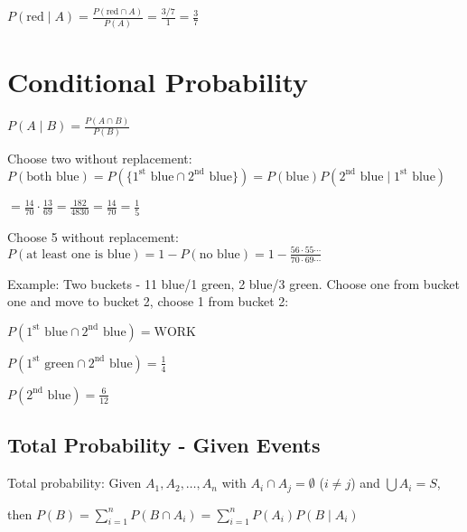 $P(\text{red} \mid A) = \frac{P(\text{red} \cap A)}{P(A)} = \frac{3/7}{1} = \frac{3}{7}$

\section{Conditional Probability}

\begin{definition}
$P(A \mid B) = \frac{P(A \cap B)}{P(B)}$
\end{definition}

Choose two without replacement: $P(\text{both blue}) = P(\{1^{\text{st}} \text{ blue} \cap 2^{\text{nd}} \text{ blue}\}) = P(\text{blue})P(2^{\text{nd}} \text{ blue} \mid 1^{\text{st}} \text{ blue})$

$= \frac{14}{70} \cdot \frac{13}{69} = \frac{182}{4830} = \frac{14}{70} = \frac{1}{5}$

Choose 5 without replacement: $P(\text{at least one is blue}) = 1 - P(\text{no blue}) = 1 - \frac{56 \cdot 55 \cdots}{70 \cdot 69 \cdots}$

Example: Two buckets - 11 blue/1 green, 2 blue/3 green. Choose one from bucket one and move to bucket 2, choose 1 from bucket 2:

$P(1^{\text{st}} \text{ blue} \cap 2^{\text{nd}} \text{ blue}) = \text{WORK}$

$P(1^{\text{st}} \text{ green} \cap 2^{\text{nd}} \text{ blue}) = \frac{1}{4}$

$P(2^{\text{nd}} \text{ blue}) = \frac{6}{12}$

\subsection{Total Probability - Given Events}
Total probability: Given $A_1, A_2, \ldots, A_n$ with $A_i \cap A_j = \emptyset$ ($i \neq j$) and $\bigcup A_i = S$,

then $P(B) = \sum_{i=1}^n P(B \cap A_i) = \sum_{i=1}^n P(A_i)P(B \mid A_i)$
